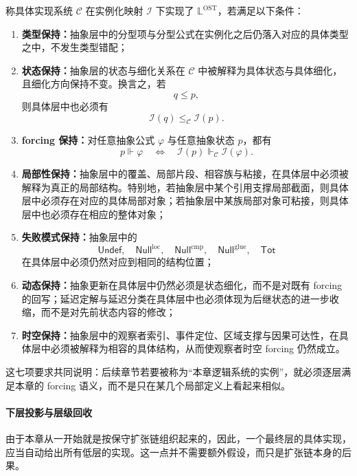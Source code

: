 \begin{definition}[实现]\label{def:logic-expansion-realization}
称具体实现系统 \(\mathcal C\) 在实例化映射 \(\mathcal I\) 下实现了 \(\mathbb L^{\mathrm{OST}}\)，若满足以下条件：
\begin{enumerate}
  \item \textbf{类型保持：}抽象层中的分型项与分型公式在实例化之后仍落入对应的具体类型之中，不发生类型错配；
  \item \textbf{状态保持：}抽象层的状态与细化关系在 \(\mathcal C\) 中被解释为具体状态与具体细化，且细化方向保持不变。换言之，若
  \[
  q\le p,
  \]
  则具体层中也必须有
  \[
  \mathcal I(q)\le_{\mathcal C}\mathcal I(p).
  \]
  \item \textbf{forcing 保持：}对任意抽象公式 \(\varphi\) 与任意抽象状态 \(p\)，都有
  \[
  p\Vdash \varphi
  \quad\Longleftrightarrow\quad
  \mathcal I(p)\Vdash_{\mathcal C}\mathcal I(\varphi).
  \]
  \item \textbf{局部性保持：}抽象层中的覆盖、局部片段、相容族与粘接，在具体层中必须被解释为真正的局部结构。特别地，若抽象层中某个引用支撑局部截面，则具体层中必须存在对应的具体局部对象；若抽象层中某族局部对象可粘接，则具体层中也必须存在相应的整体对象；
  \item \textbf{失败模式保持：}抽象层中的
  \[
  \mathsf{Undef},
  \quad
  \mathsf{Null}^{\mathrm{loc}},
  \quad
  \mathsf{Null}^{\mathrm{cmp}},
  \quad
  \mathsf{Null}^{\mathrm{glue}},
  \quad
  \mathsf{Tot}
  \]
  在具体层中必须仍然对应到相同的结构位置；
  \item \textbf{动态保持：}抽象更新在具体层中仍然必须是状态细化，而不是对既有 forcing 的回写；延迟定解与延迟分类在具体层中也必须体现为后继状态的进一步收缩，而不是对先前状态内容的修改；
  \item \textbf{时空保持：}抽象层中的观察者索引、事件定位、区域支撑与因果可达性，在具体层中必须被解释为相容的具体结构，从而使观察者时空 forcing 仍然成立。
\end{enumerate}
\end{definition}

这七项要求共同说明：后续章节若要被称为“本章逻辑系统的实例”，就必须逐层满足本章的 forcing 语义，而不是只在某几个局部定义上看起来相似。

\paragraph{下层投影与层级回收}
由于本章从一开始就是按保守扩张链组织起来的，因此，一个最终层的具体实现，应当自动给出所有低层的实现。这一点并不需要额外假设，而只是扩张链本身的后果。


